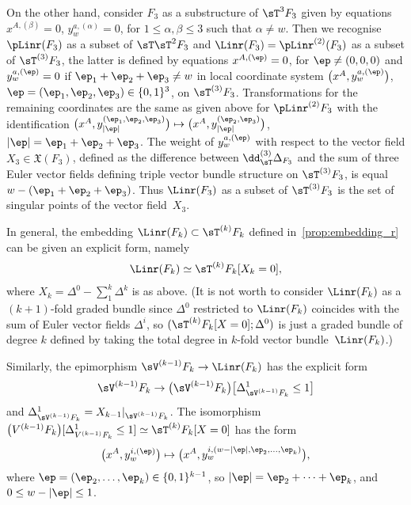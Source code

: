 On the other hand, consider $F_3$ as a substructure of $\sT^3 F_3$ given by equations $x^{A, (\beta)} = 0$, $y^{a, (\alpha)}_w = 0$, for $1\leq \alpha, \beta\leq 3$ such that $\alpha \neq w$. Then we recognise $\pLinr(F_3)$ as a subset of $\sT \sT^2 F_3$ and $\Linr(F_3)=\pLinr^{(2)}(F_3)$ as a subset of $\sT^{(3)} F_3$, the latter is def\/ined by equations $x^{A, (\ep)} =0$, for $\ep\neq (0,0,0)$ and $y_w^{a, (\ep)} = 0$ if $\ep_1+\ep_2+\ep_3\neq w$ in local coordinate system $\big(x^A, y_w^{a, (\ep)}\big)$, $\ep = (\ep_1, \ep_2, \ep_3)\in\{0, 1\}^3$, on $\sT^{(3)} F_3$. Transformations for the remaining coordinates are the same as given above for $\pLinr^{(2)} F_3$ with the identif\/ication $\big(x^A, y_{|\ep|}^{(\ep_1, \ep_2, \ep_3)}\big) \mapsto \big(x^A, y_{|\ep|}^{(\ep_2, \ep_3)}\big)$, $|\ep| = \ep_1+\ep_2+\ep_3$. The weight of $y_w^{a, (\ep)}$ with respect to the vector f\/ield $X_3\in \mathfrak{X}(F_3)$, def\/ined as the dif\/ference between $\dd_\sT^{(3)} \Delta_{F_3}$ and the sum of three Euler vector f\/ields def\/ining triple vector bundle structure on $\sT^{(3)} F_3$, is equal $w-(\ep_1+\ep_2+\ep_3)$. Thus $\Linr(F_3)$ as a subset of $\sT^{(3)} F_3$ is the set of singular points of the vector f\/ield~$X_3$.

In general, the embedding $\Linr (F_k) \subset \sT^{(k)} F_k$ def\/ined in~\eqref{prop:embedding_r} can be given an explicit form, namely
\begin{gather}\label{eqn:full_linearisation_def}
\Linr(F_k) \simeq \sT^{(k)}F_k[X_k=0],
\end{gather}
where $X_k = \Delta^0 - \sum_1^k \Delta^k$ is as above. (It is not worth to consider $\Linr(F_k)$ as a $(k+1)$-fold graded bundle since $\Delta^0$ restricted to $\Linr(F_k)$ coincides with the sum of Euler vector f\/ields $\Delta^i$, so $(\sT^{(k)} F_k [X = 0]; \Delta^{0})$ is just a graded bundle of degree $k$ def\/ined by taking the total degree in $k$-fold vector bundle~$\Linr(F_k)$.)

Similarly, the epimorphism $\sV^{(k-1)} F_k \rightarrow \Linr(F_k)$ has the explicit form
\begin{gather}\label{eqn:LF_k_explicit}
\sV^{(k-1)} F_k \rightarrow \big(\sV^{(k-1)}F_{k} \big)\big[\Delta^{1}_{\sV^{(k-1)}F_{k}} \leq 1\big]
\end{gather}
and $\Delta^{1}_{\sV^{(k-1)}F_{k}} = X_{k-1}|_{\sV^{(k-1)}F_{k}}$. The isomorphism $\big(V^{(k-1)}F_{k} \big)[\Delta^{1}_{V^{(k-1)}F_{k}} \leq 1] \simeq \sT^{(k)}F_k[X=0]$ has the form
\begin{gather}\label{eqn:local_iso_LFk_explicit}
\big(x^A, y^{i, (\ep)}_w\big) \mapsto \big(x^A, y^{i, (w-|\ep|, \ep_2, \ldots, \ep_k)}_w\big),
\end{gather}
where $\ep = (\ep_2, \ldots, \ep_k)\in \{0,1\}^{k-1}$, so $|\ep| = \ep_2+ \cdots+ \ep_k$, and $0\leq w-|\ep|\leq 1$.

